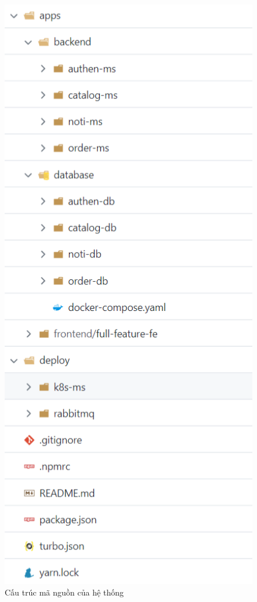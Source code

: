 \begin{figure}[H]
    \begin{center}
        \includegraphics[scale = 1.5]{images/hanh/ecomm-app-source-code.png}
        \vspace*{2mm}
    \end{center}
    \caption{Cấu trúc mã nguồn của hệ thống}
    \label{fig:ecomm_app_source_code}
\end{figure}
